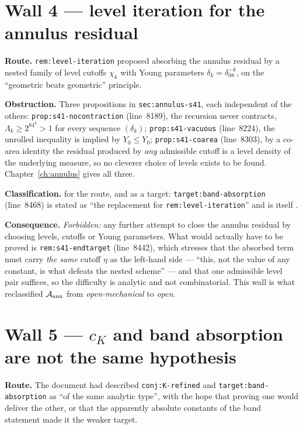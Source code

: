 \section{Wall 4 --- level iteration for the annulus residual}
\label{sec:wall4}

\textbf{Route.} \texttt{rem:level-iteration} proposed absorbing the annulus
residual by a nested family of level cutoffs \(\chi_k\) with Young parameters
\(\delta_k=\delta_08^{-k}\), on the ``geometric beats geometric'' principle.

\textbf{Obstruction.} Three propositions in \texttt{sec:annulus-s41}, each
independent of the others: \texttt{prop:s41-\allowbreak{}nocontraction} (line~8189), the
recursion never contracts, \(\Lambda_k\ge2^84^k>1\) for every sequence
\((\delta_k)\); \texttt{prop:s41-vacuous} (line~8224), the unrolled inequality
is implied by \(Y_0\le Y_0\); \texttt{prop:s41-coarea} (line~8303), by a
co-area identity the residual produced by \emph{any} admissible cutoff is a
level density of the underlying measure, so no cleverer choice of levels exists
to be found. Chapter~\ref{ch:annulus} gives all three.

\textbf{Classification.} \IMPOSSIBLE{} for the route, and \SUPERSEDED{} as a
target: \texttt{target:band-absorption} (line~8468) is stated as ``the
replacement for \texttt{rem:level-iteration}'' and is itself \OPEN{}.

\textbf{Consequence.} \emph{Forbidden:} any further attempt to close the
annulus residual by choosing levels, cutoffs or Young parameters. What would
actually have to be proved is \texttt{rem:s41-endtarget} (line~8442), which
stresses that the absorbed term must carry \emph{the same} cutoff \(\eta\) as
the left-hand side --- ``this, not the value of any constant, is what defeats
the nested scheme'' --- and that one admissible level pair suffices, so the
difficulty is analytic and not combinatorial. This wall is what reclassified
\(\mathcal{A}_{\mathrm{ann}}\) from \emph{open-mechanical} to \emph{open}.

\section{Wall 5 --- \texorpdfstring{\(c_K\)}{c\_K} and band absorption are not the same hypothesis}
\label{sec:wall5}

\textbf{Route.} The document had described \texttt{conj:K-refined} and
\texttt{target:band-absorption} as ``of the same analytic type'', with the hope
that proving one would deliver the other, or that the apparently absolute
constants of the band statement made it the weaker target.

